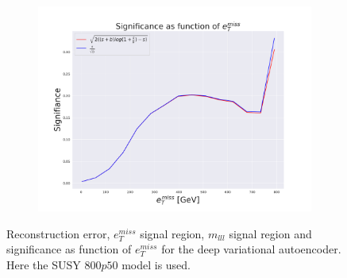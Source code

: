 \begin{figure}[H]
    \begin{subfigure}{.60\textwidth}
        \includegraphics[width=\textwidth]{Figures/VAE_testing/big/2lep/significance_etmiss_800p0p050_-0.7232197345309495.pdf}
        \caption{}
        \label{fig:VAE_2lep_big_signi_800}
    \end{subfigure}
    \hfill      
    \caption[2lep deep network | $800p50$ | VAE]{Reconstruction error, $e_T^{miss}$ signal region, $m_{lll}$ signal region and significance as function of 
    $e_T^{miss}$ for the deep variational autoencoder. Here the SUSY $800p50$ model is used.}
    \label{fig:VAE_2lep_big_rec_sig_signi_800}
\end{figure}

